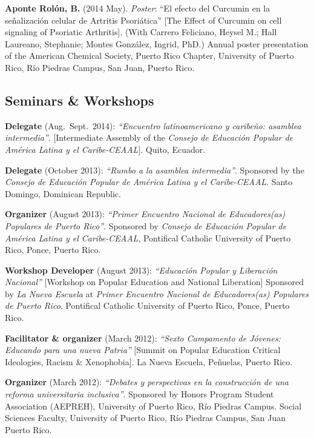 \documentclass[
  letterpaper,
  DIV=11,
  numbers=noendperiod]{scrartcl}
\begin{document}
\textbf{Aponte Rolón, B.} (2014 May). \emph{Poster}: ``El efecto del
Curcumin en la señalización celular de Artritis Psoriática'' {[}The
Effect of Curcumin on cell signaling of Psoriatic Arthritis{]}. (With
Carrero Feliciano, Heysel M.; Hall Laureano, Stephanie; Montes González,
Ingrid, PhD.) Annual poster presentation of the American Chemical
Society, Puerto Rico Chapter, University of Puerto Rico, Río Piedras
Campus, San Juan, Puerto Rico.

\subsection{\texorpdfstring{ Seminars \&
Workshops}{ Seminars \& Workshops}}\label{seminars-workshops}

\textbf{Delegate} (Aug.~Sept.~2014): \emph{``Encuentro latinoamericano y
caribeño: asamblea intermedia''}. {[}Intermediate Assembly of the
\emph{Consejo de Educación Popular de América Latina y el
Caribe-CEAAL}{]}. Quito, Ecuador.

\textbf{Delegate} (October 2013): \emph{``Rumbo a la asamblea
intermedia''}. Sponsored by the \emph{Consejo de Educación Popular de
América Latina y el Caribe-CEAAL}. Santo Domingo, Dominican Republic.

\textbf{Organizer} (August 2013): \emph{``Primer Encuentro Nacional de
Educadores(as) Populares de Puerto Rico''}. Sponsored by \emph{Consejo
de Educación Popular de América Latina y el Caribe-CEAAL}, Pontifical
Catholic University of Puerto Rico, Ponce, Puerto Rico.

\textbf{Workshop Developer} (August 2013): \emph{``Educación Popular y
Liberación Nacional''} {[}Workshop on Popular Education and National
Liberation{]} Sponsored by \emph{La Nueva Escuela} at \emph{Primer
Encuentro Nacional de Educadores(as) Populares de Puerto Rico}.
Pontifical Catholic University of Puerto Rico, Ponce, Puerto Rico.

\textbf{Facilitator \& organizer} (March 2012): \emph{``Sexto Campamento
de Jóvenes: Educando para una nueva Patria''} {[}Summit on Popular
Education Critical Ideologies, Racism \& Xenophobia{]}. La Nueva
Escuela, Peñuelas, Puerto Rico.

\textbf{Organizer} (March 2012): \emph{``Debates y perspectivas en la
construcción de una reforma universitaria inclusiva''}. Sponsored by
Honors Program Student Association (AEPREH), University of Puerto Rico,
Río Piedras Campus. Social Sciences Faculty, University of Puerto Rico,
Río Piedras Campus, San Juan Puerto Rico.
\end{document}
